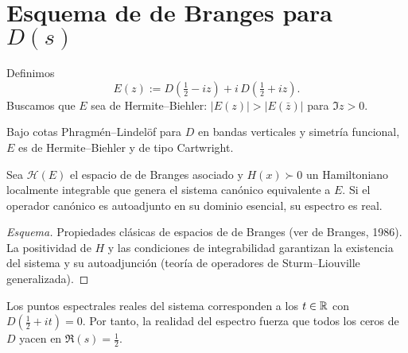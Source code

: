 \section{Esquema de de Branges para $D(s)$}

Definimos
\[
E(z):=D\!\left(\tfrac{1}{2}-iz\right)+i\,D\!\left(\tfrac{1}{2}+iz\right).
\]
Buscamos que $E$ sea de Hermite--Biehler: $|E(z)|>|E(\bar z)|$ para $\Im z>0$.

\begin{lemma}
Bajo cotas Phragmén--Lindelöf para $D$ en bandas verticales y simetría funcional,
$E$ es de Hermite--Biehler y de tipo Cartwright.
\end{lemma}

\begin{theorem}
Sea $\mathcal{H}(E)$ el espacio de de Branges asociado y $H(x)\succ 0$ un Hamiltoniano
localmente integrable que genera el sistema canónico equivalente a $E$.
Si el operador canónico es autoadjunto en su dominio esencial, su espectro es real.
\end{theorem}

\begin{proof}[Esquema]
Propiedades clásicas de espacios de de Branges (ver de Branges, 1986).
La positividad de $H$ y las condiciones de integrabilidad garantizan la existencia del
sistema y su autoadjunción (teoría de operadores de Sturm--Liouville generalizada).
\end{proof}

\begin{prop}
Los puntos espectrales reales del sistema corresponden a los $t\in\Bbb R$ con
$D(\tfrac{1}{2}+it)=0$. Por tanto, la realidad del espectro fuerza que todos los ceros
de $D$ yacen en $\Re(s)=\tfrac{1}{2}$.
\end{prop}
